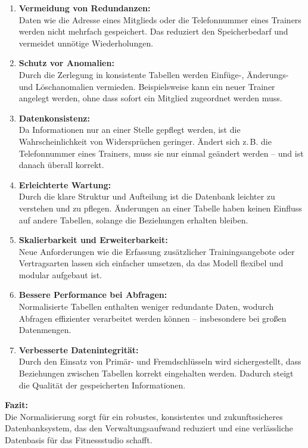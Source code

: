 \documentclass{article}
\begin{document}
	\begin{enumerate}
		\item \textbf{Vermeidung von Redundanzen:} \\
		Daten wie die Adresse eines Mitglieds oder die Telefonnummer eines Trainers werden nicht mehrfach gespeichert. Das reduziert den Speicherbedarf und vermeidet unnötige Wiederholungen.
		
		\item \textbf{Schutz vor Anomalien:} \\
		Durch die Zerlegung in konsistente Tabellen werden Einfüge-, Änderungs- und Löschanomalien vermieden. Beispielsweise kann ein neuer Trainer angelegt werden, ohne dass sofort ein Mitglied zugeordnet werden muss.
		
		\item \textbf{Datenkonsistenz:} \\
		Da Informationen nur an einer Stelle gepflegt werden, ist die Wahrscheinlichkeit von Widersprüchen geringer. Ändert sich z.\,B. die Telefonnummer eines Trainers, muss sie nur einmal geändert werden – und ist danach überall korrekt.
		
		\item \textbf{Erleichterte Wartung:} \\
		Durch die klare Struktur und Aufteilung ist die Datenbank leichter zu verstehen und zu pflegen. Änderungen an einer Tabelle haben keinen Einfluss auf andere Tabellen, solange die Beziehungen erhalten bleiben.
		
		\item \textbf{Skalierbarkeit und Erweiterbarkeit:} \\
		Neue Anforderungen wie die Erfassung zusätzlicher Trainingsangebote oder Vertragsarten lassen sich einfacher umsetzen, da das Modell flexibel und modular aufgebaut ist.
		
		\item \textbf{Bessere Performance bei Abfragen:} \\
		Normalisierte Tabellen enthalten weniger redundante Daten, wodurch Abfragen effizienter verarbeitet werden können – insbesondere bei großen Datenmengen.
		
		\item \textbf{Verbesserte Datenintegrität:} \\
		Durch den Einsatz von Primär- und Fremdschlüsseln wird sichergestellt, dass Beziehungen zwischen Tabellen korrekt eingehalten werden. Dadurch steigt die Qualität der gespeicherten Informationen.
	\end{enumerate}
	
	\textbf{Fazit:} \\
	Die Normalisierung sorgt für ein robustes, konsistentes und zukunftssicheres Datenbanksystem, das den Verwaltungsaufwand reduziert und eine verlässliche Datenbasis für das Fitnessstudio schafft.
	
	
	
\end{document}
